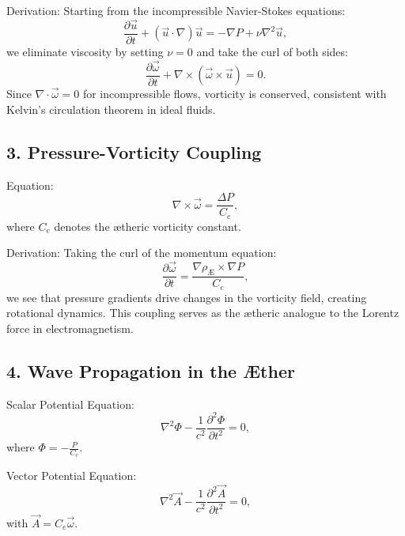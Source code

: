         Derivation:
        Starting from the incompressible Navier-Stokes equations:
        \begin{equation*}
            \frac{\partial \vec{u}}{\partial t} + (\vec{u} \cdot \nabla) \vec{u} = -\nabla P + \nu \nabla^2 \vec{u},
        \end{equation*}
        we eliminate viscosity by setting $\nu = 0$ and take the curl of both sides:
        \begin{equation*}
            \frac{\partial \vec{\omega}}{\partial t} + \nabla \times (\vec{\omega} \times \vec{u}) = 0.
        \end{equation*}
        Since $\nabla \cdot \vec{\omega} = 0$ for incompressible flows, vorticity is conserved, consistent with Kelvin's circulation theorem in ideal fluids.

        \subsection*{3. Pressure-Vorticity Coupling}
        Equation:
        \begin{equation*}
            \nabla \times \vec{\omega} = \frac{\Delta P}{C_e},
        \end{equation*}
        where $C_e$ denotes the ætheric vorticity constant.

        Derivation:
        Taking the curl of the momentum equation:
        \begin{equation*}
            \frac{\partial \vec{\omega}}{\partial t} = \frac{\nabla \rho_\text{Æ} \times \nabla P}{C_e},
        \end{equation*}
        we see that pressure gradients drive changes in the vorticity field, creating rotational dynamics. This coupling serves as the ætheric analogue to the Lorentz force in electromagnetism.

        \subsection*{4. Wave Propagation in the Æther}
        Scalar Potential Equation:
        \begin{equation*}
            \nabla^2 \Phi - \frac{1}{c^2} \frac{\partial^2 \Phi}{\partial t^2} = 0,
        \end{equation*}
        where $\Phi = -\frac{P}{C_e}$.

        Vector Potential Equation:
        \begin{equation*}
            \nabla^2 \vec{A} - \frac{1}{c^2} \frac{\partial^2 \vec{A}}{\partial t^2} = 0,
        \end{equation*}
        with $\vec{A} = C_e \vec{\omega}$.

